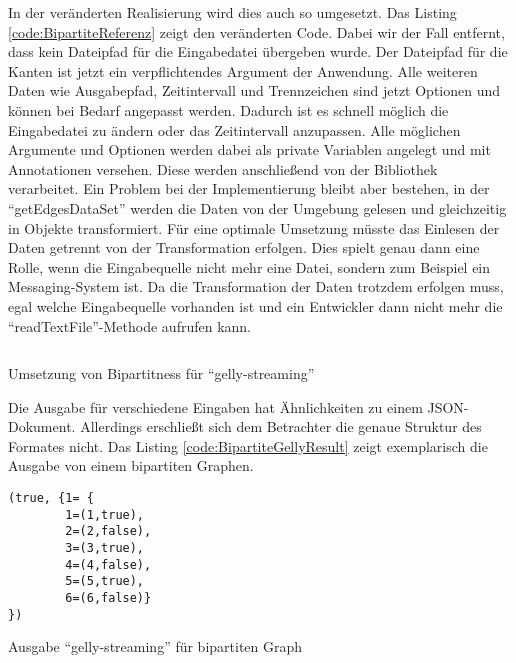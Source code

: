 In der veränderten Realisierung wird dies auch so umgesetzt. Das Listing \ref{code:BipartiteReferenz}
zeigt den veränderten Code. Dabei wir der Fall entfernt, dass kein Dateipfad
für die Eingabedatei übergeben wurde. Der Dateipfad für die Kanten ist jetzt ein
verpflichtendes Argument der Anwendung. Alle weiteren Daten wie Ausgabepfad,
Zeitintervall und Trennzeichen sind jetzt Optionen und können bei Bedarf angepasst
werden. Dadurch ist es schnell möglich die Eingabedatei zu ändern oder das
Zeitintervall anzupassen. Alle möglichen Argumente und Optionen werden dabei als
private Variablen angelegt und mit Annotationen versehen. Diese werden anschließend
von der Bibliothek verarbeitet.  Ein Problem bei der Implementierung bleibt aber
bestehen, in der \enquote{getEdgesDataSet} werden die Daten von der Umgebung
gelesen und gleichzeitig in Objekte transformiert. Für eine optimale Umsetzung
müsste das Einlesen der Daten getrennt von der Transformation erfolgen.
Dies spielt genau dann eine Rolle, wenn die Eingabequelle nicht mehr eine Datei,
sondern zum Beispiel ein Messaging-System ist. Da die Transformation der
Daten trotzdem erfolgen muss, egal welche Eingabequelle vorhanden ist und ein
Entwickler dann nicht mehr die \enquote{readTextFile}-Methode aufrufen kann.

\begin{listing}
\inputminted[breaklines=true]{java}{../material/code/GellyStreamingResult.java}
\caption{Umsetzung von Bipartitness für \enquote{gelly-streaming}}
\label{code:BipartiteReferenz}
\end{listing}

Die Ausgabe für verschiedene Eingaben hat Ähnlichkeiten zu einem
\gls{JSON}-Dokument. Allerdings erschließt sich dem Betrachter die genaue
Struktur des Formates nicht. Das Listing \ref{code:BipartiteGellyResult} zeigt
exemplarisch die Ausgabe von einem bipartiten Graphen.

\begin{listing}
\begin{verbatim}
(true, {1= {
        1=(1,true),
        2=(2,false),
        3=(3,true),
        4=(4,false),
        5=(5,true),
        6=(6,false)}
})
\end{verbatim}
\caption{Ausgabe \enquote{gelly-streaming} für bipartiten Graph}
\label{code:BipartiteGellyResult}
\end{listing}

